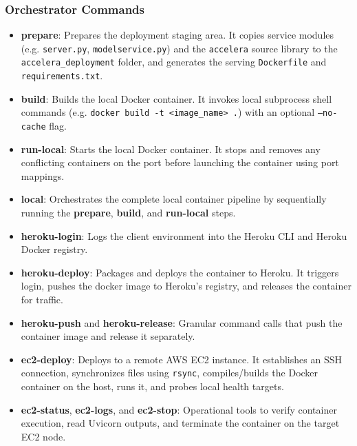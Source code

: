 \subsubsection{Orchestrator Commands}
\begin{itemize}[leftmargin=*]
  \item \textbf{prepare}: Prepares the deployment staging area. It copies service modules (e.g. \texttt{server.py}, \texttt{modelservice.py}) and the \texttt{accelera} source library to the \texttt{accelera\_deployment} folder, and generates the serving \texttt{Dockerfile} and \texttt{requirements.txt}.
  \item \textbf{build}: Builds the local Docker container. It invokes local subprocess shell commands (e.g. \texttt{docker build -t <image\_name> .}) with an optional \texttt{--no-cache} flag.
  \item \textbf{run-local}: Starts the local Docker container. It stops and removes any conflicting containers on the port before launching the container using port mappings.
  \item \textbf{local}: Orchestrates the complete local container pipeline by sequentially running the \textbf{prepare}, \textbf{build}, and \textbf{run-local} steps.
  \item \textbf{heroku-login}: Logs the client environment into the Heroku CLI and Heroku Docker registry.
  \item \textbf{heroku-deploy}: Packages and deploys the container to Heroku. It triggers login, pushes the docker image to Heroku's registry, and releases the container for traffic.
  \item \textbf{heroku-push} and \textbf{heroku-release}: Granular command calls that push the container image and release it separately.
  \item \textbf{ec2-deploy}: Deploys to a remote AWS EC2 instance. It establishes an SSH connection, synchronizes files using \texttt{rsync}, compiles/builds the Docker container on the host, runs it, and probes local health targets.
  \item \textbf{ec2-status}, \textbf{ec2-logs}, and \textbf{ec2-stop}: Operational tools to verify container execution, read Uvicorn outputs, and terminate the container on the target EC2 node.
\end{itemize}

